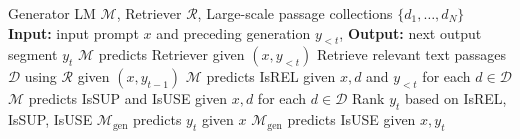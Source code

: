 \begin{algorithm}
\renewcommand{\algorithmicrequire}{\textbf{Require}}
\caption{SELF-RAG inference}\label{alg:cap1}
\begin{algorithmic}[1]
\Require Generator LM $\mathcal{M}$, Retriever $\mathcal{R}$, Large-scale passage collections $\{d_1, \ldots, d_N\}$
\State \textbf{Input:} input prompt $x$ and preceding generation $y_{<t}$, \textbf{Output:} next output segment $y_t$
\State $\mathcal{M}$ predicts Retriever given $(x, y_{<t})$
    \State Retrieve relevant text passages $\mathcal{D}$ using $\mathcal{R}$ given $(x, y_{t-1})$  
    \State $\mathcal{M}$ predicts IsREL given $x, d$ and $y_{<t}$ for each $d \in \mathcal{D}$ \hfill {}
    \State $\mathcal{M}$ predicts IsSUP and IsUSE given $x, d$ for each $d \in \mathcal{D}$ \hfill {}
    \State Rank $y_t$ based on IsREL, IsSUP, IsUSE
    \State $\mathcal{M}_{\text{gen}}$ predicts $y_t$ given $x$ \hfill {}
    \State $\mathcal{M}_{\text{gen}}$ predicts IsUSE given $x, y_t$ \hfill {}
\EndIf
\end{algorithmic}
\end{algorithm}

